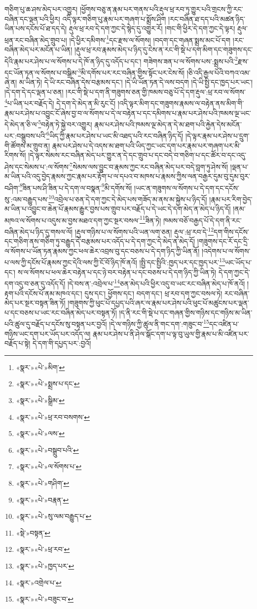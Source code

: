 གཅིག་པུ་ཆ་ཤས་མེད་པར་འགྱུར། །ཕྱོགས་བཅུ་ན་རྣམ་པར་གནས་པའི་རྡུལ་ཕྲ་རབ་ཏུ་གྱུར་པའི་གྲངས་ཀྱི་རང་བཞིན་དང་ལྡན་པའི་ཕྱིར། འདི་ལྟར་གཅིག་པུ་རྣམ་པར་གཞག་པ་སྨྲོས་ཤིག །རང་བཞིན་ཐ་དད་པའི་མཚན་ཉིད་ཡིན་པས་དངོས་པོ་ཐ་དད་དེ། རྡུལ་ཕྲ་རབ་དེ་དག་ཀྱང་དེ་སྙེད་དུ་འགྱུར་རོ། །གང་གི་ཕྱིར་དེ་དག་ཀྱང་དེ་ལྟར། རྡུལ་ཕྲན་རང་བཞིན་མེད་གྲུབ་པ། །དེ་ཕྱིར་དམིགས་\footnote{«སྣར་»«པེ་»མིག་}དང་རྫས་ལ་སོགས། །བདག་དང་གཞན་སྨྲས་མང་པོ་དག །རང་བཞིན་མེད་པར་མངོན་པ་ཡིན། །རྡུལ་ཕྲ་རབ་རྣམས་མེད་པ་ཉིད་དུ་ངེས་ན་རང་གི་སྡེ་པ་དག་མིག་དང་གཟུགས་དང་དེའི་རྣམ་པར་ཤེས་པ་ལ་སོགས་པ་དེ་ཁོ་ན་ཉིད་དུ་འདོད་པ་དང་། གཟེགས་ཟན་པ་ལ་སོགས་པས་:སྨྲས་པའི་\footnote{«སྣར་»«པེ་»སྨྲས་པ་དང་}རྫས་དང་ཡོན་ཏན་ལ་སོགས་པ་བསྒྲིམ་\footnote{«སྣར་»«པེ་»སྒྲིམ་}མི་དགོས་པར་རང་བཞིན་གྱིས་སྟོང་པར་ངེས་སོ། །ཅི་འདི་རྒྱལ་པོའི་བཀའ་འམ་ཞེ་ན། མ་ཡིན་ཏེ། དེ་ཡི་རང་བཞིན་དེས་བརྩམས་དང་། །དེ་ཡི་ཡོན་ཏན་དེ་ལས་བདག །དེ་ཡི་སྤྱི་དང་ཁྱད་པར་ཡང་། །དེ་དག་དེ་དང་ལྡན་པ་ཅན། །རང་གི་སྡེ་པ་དག་ནི་གཟུགས་ཅན་གྱི་ཁམས་བཅུ་པོ་དེ་དག་རྡུལ་:ཕྲ་རབ་ལ་སོགས་\footnote{«སྣར་»«པེ་»ཕྲ་རབ་བསགས་}པ་ཡིན་པར་བརྗོད་དེ། དེ་དག་དེ་མེད་ན་མི་རུང་ངོ། །འདི་ལྟར་མིག་དང་གཟུགས་རྣམས་ལ་བརྟེན་ནས་མིག་གི་རྣམ་པར་ཤེས་པ་འབྱུང་ངོ་ཞེས་བྱ་བ་ལ་སོགས་པ་དེ་ལ་བརྟེན་པ་དང་དམིགས་པ་རྣམ་པར་ཤེས་པའི་ཁམས་ལྔ་ཡང་དེ་མེད་ན་ཅི་ལ་\footnote{«སྣར་»«པེ་»ལས་}བརྟེན་ཏེ་སྐྱེ་བར་འགྱུར། རྣམ་པར་ཤེས་པའི་ཁམས་ལྔ་མེད་ན་དེ་མ་ཐག་པའི་རྐྱེན་དེས་མངོན་པར་:བསྒྲུབས་པའི་\footnote{«སྣར་»«པེ་»བསྒྲུབ་པའི་}ཡིད་ཀྱི་རྣམ་པར་ཤེས་པ་ཡང་མི་འཐད་པའི་རང་བཞིན་ཉིད་དོ། །དེ་ལྟར་རྣམ་པར་ཤེས་པ་དྲུག་གི་ཚོགས་མ་གྲུབ་ན། རྣམ་པར་ཤེས་པ་དེ་འདས་མ་ཐག་པའི་ཡིད་ཀྱང་ཡང་དག་པར་རྣམ་པར་གཞག་པར་མི་རིགས་སོ། །དེ་ལྟར་སེམས་རང་བཞིན་མེད་པར་གྱུར་ན་དེ་དང་གྲུབ་པ་དང་བདེ་བ་གཅིག་པ་དང་ཚོར་བ་དང་འདུ་ཤེས་དང་སེམས་པ་:ལ་སོགས་\footnote{«སྣར་»«པེ་»ལ་སོགས་པ་}སེམས་ལས་བྱུང་བ་རྣམས་ཀྱང་རང་བཞིན་མེད་པར་བདེ་བླག་ཏུ་ཤེས་སོ། །ལྡན་པ་མ་ཡིན་པའི་འདུ་བྱེད་རྣམས་ཀྱང་རྣམ་པར་རྟོག་པ་ལ་དཔའ་བ་མཁས་པ་རྣམས་ཀྱིས་ལན་བརྒྱར་དུམ་བུ་དུམ་བུར་བཤིག་\footnote{«སྣར་»«པེ་»གཤིག་}ཟིན་པས་ཤི་ཟིན་པ་དེ་དག་ལ་བསྣན་\footnote{«སྣར་»«པེ་»བརྣན་}མི་དགོས་སོ། །ཡང་ན་གཟུགས་ལ་སོགས་པ་དེ་དག་དང་དངོས་སུ་:འམ་བརྒྱུད་པས་\footnote{«སྣར་»«པེ་»སུ་ལམ་བརྒྱུད་པ་}འབྲེལ་པ་ཅན་དེ་དག་ཀྱང་དེ་མེད་པས་གཟོད་མ་ནས་མ་སྐྱེས་པ་ཉིད་དོ། །རྣམ་པར་རིག་བྱེད་མ་ཡིན་པ་འབྱུང་བ་ཆེན་པོ་རྣམས་རྒྱུར་བྱས་པས་གྲུབ་པར་བརྗོད་པ་དེ་ཡང་དེ་དག་མེད་ན་མེད་པ་ཉིད་དོ། །ནམ་མཁའ་ལ་སོགས་པ་འདུས་མ་བྱས་མཐའ་དག་ཀྱང་སྔར་བསལ་\footnote{«སྡེ་»བསྟན་}ཟིན་ཏེ། ཁམས་བཅོ་བརྒྱད་པོ་དེ་དག་ནི་རང་བཞིན་མེད་པ་ཉིད་དུ་གསལ་ལོ། །རྡུལ་གཉིས་པ་ལ་སོགས་པའི་ཡན་ལག་ཅན། རྡུལ་:ཕྲ་རབ་དེ་\footnote{«སྣར་»«པེ་»ཕྲ་རབ་}དག་གིས་དངོས་དང་གཅིག་ནས་གཅིག་ཏུ་བརྒྱུད་དེ་བརྩམས་པར་འདོད་པ་དེ་དག་ཀྱང་དེ་མེད་ན་མེད་དོ། །གཟུགས་དང་རོ་དང་དྲི་ལ་སོགས་པ་ཡོན་ཏན་རྣམས་ཀྱང་ཕལ་ཆེར་འབྲས་བུ་དང་བཅས་པ་དེ་དག་ཉིད་ཀྱི་ཡིན་ནོ། །འདེགས་པ་ལ་སོགས་པ་ལས་ཀྱི་དངོས་པོ་རྣམས་ཀྱང་དེའི་ལས་ཀྱི་ངོ་བོ་ཉིད་ཁོ་ནའོ། །སྤྱི་དང་སྤྱིའི་:ཁྱད་པར་དང་ཁྱད་པར་\footnote{«སྣར་»«པེ་»ཁྱད་པར་}ཡང་ཡོད་པ་དང་། ས་ལ་སོགས་པ་ཕལ་ཆེར་བརྟེན་པ་དང་ཉེ་བར་བརྟེན་པ་དང་བཅས་པ་དེ་དག་ཉིད་ཀྱི་ཡིན་ཏེ། དེ་དག་ཀྱང་དེ་དག་འདུ་བ་ཅན་དུ་འདོད་དོ། །དེ་བས་ན་:འབྲེལ་པ་\footnote{«སྣར་»འགྲེལ་པ་}ཅན་མེད་པའི་ཕྱིར་འདུ་བ་ཡང་རང་བཞིན་མེད་པ་ཁོ་ནའོ། །རྟག་པའི་དངོས་པོ་ནམ་མཁའ་དང་། དུས་དང་། ཕྱོགས་དང་། བདག་དང་། ཕྲ་རབ་དག་ཀྱང་བསལ་ཏེ། རང་བཞིན་མེད་པར་སྔར་བསྟན་ཟིན་ཏོ། །གཟུགས་ཀྱི་ཕུང་པོ་དཔྱད་པའི་ཞར་ལ་རྣམ་པར་ཤེས་པའི་ཕུང་པོ་མཚུངས་པར་ལྡན་པ་དང་བཅས་པ་ཡང་རང་བཞིན་མེད་པར་བསྟན་ཏོ། །ད་ནི་རང་གི་སྡེ་པ་དང་གཞན་གྱིས་གཉིས་དང་གཉིས་མ་ཡིན་པའི་ཚུལ་དུ་བརྗོད་པ་དངོས་སུ་བསྟན་པར་བྱའོ། །དེ་ལ་གཉིས་ཀྱི་ཚུལ་ནི་གང་དག་:གཟུང་བ་\footnote{«སྣར་»«པེ་»བཟུང་བ་}དང་འཛིན་པ་གཉིས་ཡང་དག་པར་ཡོད་པར་འདོད་ལ། རྣམ་པར་ཤེས་པ་ནི་ཤེལ་སྒོང་དག་པ་ལྟ་བུ་ཡུལ་གྱི་རྣམ་པ་མི་འཛིན་པར་བརྗོད་པ་སྟེ། དེ་དག་གི་དཔྱད་པར་:བྱའོ། 